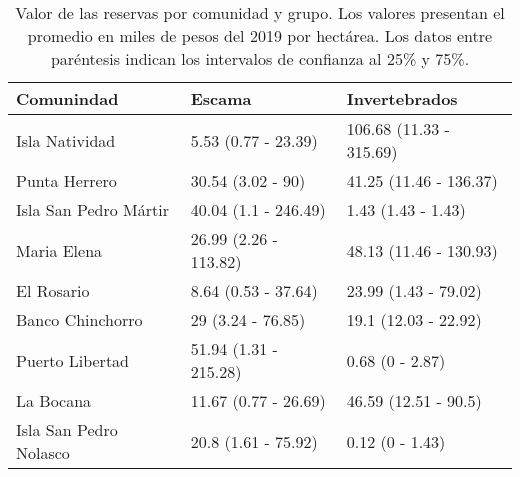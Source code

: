 \begin{table}[!h]

\caption{\label{tab:tot_val}Valor de las reservas por comunidad y grupo. Los valores presentan el promedio en miles de pesos del 2019 por hectárea. Los datos entre paréntesis indican los intervalos de confianza al 25\% y 75\%.}
\centering
\begin{tabular}[t]{lll}
\toprule
Comunindad & Escama & Invertebrados\\
\midrule
Isla Natividad & 5.53 (0.77 - 23.39) & 106.68 (11.33 - 315.69)\\
Punta Herrero & 30.54 (3.02 - 90) & 41.25 (11.46 - 136.37)\\
Isla San Pedro Mártir & 40.04 (1.1 - 246.49) & 1.43 (1.43 - 1.43)\\
Maria Elena & 26.99 (2.26 - 113.82) & 48.13 (11.46 - 130.93)\\
El Rosario & 8.64 (0.53 - 37.64) & 23.99 (1.43 - 79.02)\\
\addlinespace
Banco Chinchorro & 29 (3.24 - 76.85) & 19.1 (12.03 - 22.92)\\
Puerto Libertad & 51.94 (1.31 - 215.28) & 0.68 (0 - 2.87)\\
La Bocana & 11.67 (0.77 - 26.69) & 46.59 (12.51 - 90.5)\\
Isla San Pedro Nolasco & 20.8 (1.61 - 75.92) & 0.12 (0 - 1.43)\\
\bottomrule
\end{tabular}
\end{table}